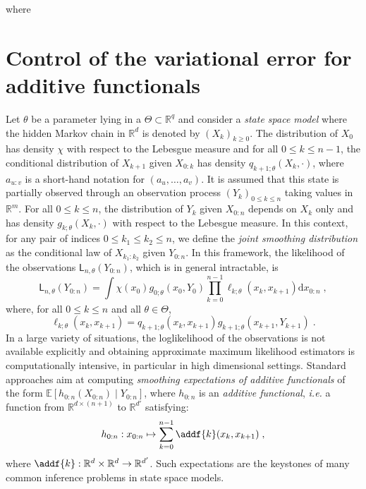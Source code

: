 \documentclass{article}
\newcommand{\1}{\mathbbm{1}}
\newcommand{\md}[1]{g_{#1}}
\newcommand{\llh}[1]{\mathsf{L}_{#1}}
\newcommand{\parvec}{\theta}
\newcommand{\parspace}{\Theta}
\newcommand{\af}[1]{h_{#1}}
\newcommand{\hd}[1]{q_{#1}}
\def\pE{\mathbb{E}}
\newcommand{\rset}{\ensuremath{\mathbb{R}}}
\newcommand{\rmd}{\ensuremath{\mathrm{d}}}
\newcommand{\eqsp}{\;}
\newcommand{\qg}[1]{\ell_{#1}}
\begin{document}
where 

\clearpage
\newpage

\section{Control of the variational error for additive functionals}
Let $\parvec$ be a parameter lying in a $\Theta\subset \rset^q$ and consider a  \textit{state space model} where the hidden Markov chain  in $\rset^d$ is denoted by $(X_k)_{k\geqslant 0}$. The distribution of $X_0$ has density $\chi$ with respect to the Lebesgue measure and for all $0\leqslant k \leqslant n-1$, the conditional distribution of $X_{k+1} $ given $X_{0:k}$ has density $\hd{k+1;\parvec}(X_{k},\cdot)$, where $a_{u:v}$ is a short-hand notation for $(a_u,\ldots,a_v)$. 
It is assumed that this state  is partially observed  through an observation process $(Y_k)_{0\leqslant k \leqslant n}$ taking values in $\rset^m$. 
For all $0\leqslant k \leqslant n$, the distribution of $Y_k$ given $X_{0:n}$ depends on $X_k$ only and has density $\md{k;\parvec}(X_k,\cdot)$ with respect to the Lebesgue measure. 
In this context, for any pair of indices $0\leqslant k_1 \leqslant k_2 \leqslant n$, we define the \textit{joint smoothing distribution} as the conditional law of $X_{k_1:k_2}$ given $Y_{0:n}$. 
In this framework, the likelihood of the observations $\llh{n,\parvec}(Y_{0:n})$, which is  in general intractable, is
$$
\llh{n,\parvec}(Y_{0:n})  = \int \chi(x_0)\md{0;\parvec}(x_{0},Y_{0})\prod_{k=0}^{n-1}\qg{k;\parvec}(x_{k},x_{k+1})\rmd x_{0:n}\eqsp,
$$
 where, for all $0\leqslant k \leqslant n$ and all $\parvec\in\parspace$,
\begin{equation}
\label{eq:def:elln}
\qg{k;\parvec}(x_{k},x_{k+1}) = \hd{k+1;\parvec}(x_{k}, x_{k+1})\md{k+1;\parvec}(x_{k+1},Y_{k+1})\eqsp.
\end{equation}
In a large variety of situations, the loglikelihood of the observations is not available explicitly and obtaining approximate maximum likelihood estimators is computationally intensive, in particular in high dimensional settings. Standard approaches  aim at computing \textit{smoothing expectations of additive functionals} of the form $\pE \left[\af{0:n}(X_{0:n})\middle | Y_{0:n}\right]$,  where $\af{0:n}$ is an \textit{additive functional}, \textit{i.e.} a function from $\rset^{d \times (n + 1)}$ to $\rset^{d'}$ satisfying:
\begin{equation}
\label{eq:additive:functional}
\af{0:n}: x_{0:n} \mapsto \sum_{k=0}^{n-1}\addf{k}(x_{k},x_{k+1})\eqsp,
\end{equation}
where $\addf{k}:\rset^{d} \times \rset^{d}\to\rset^{d'}$.
Such expectations are the keystones of many common inference problems in state space models.
\end{document}

